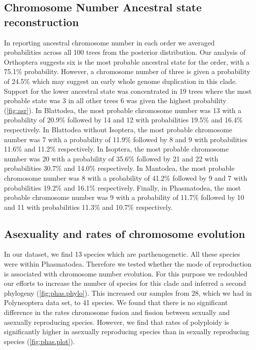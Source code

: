 \subsection{Chromosome Number Ancestral state reconstruction}
In reporting ancestral chromosome number in each order we averaged probabilities across all 100 trees from the posterior distribution. 
Our analysis of Orthoptera suggests six is the most probable ancestral state for the order, with a 75.1\% probability.
However, a chromosome number of three is given a probability of 24.5\% which may suggest an early whole genome duplication in this clade.
Support for the lower ancestral state was concentrated in 19 trees where the most probable state was 3 in all other trees 6 was given the highest probability (\cref{fig:asr}). 
In Blattodea, the most probable chromosome number was 13 with a probability of 20.9\% followed by 14 and 12 with probabilities 19.5\% and 16.4\% respectively. 
In Blattodea without Isoptera, the most probable chromosome number was 7 with a probability of 11.9\% followed by 8 and 9 with probabilities 11.6\% and 11.2\% respectively.
In Isoptera, the most probable chromosome number was 20 with a probability of 35.6\% followed by 21 and 22 with probabilities 30.7\% and 14.0\% respectively.
In Mantodea, the most probable chromosome number was 8 with a probability of 41.2\% followed by 9 and 7 with probabilities 19.2\% and 16.1\% respectively.
Finally, in Phasmatodea, the most probable chromosome number was 9 with a probability of 11.7\% followed by 10 and 11 with probabilities 11.3\% and 10.7\% respectively.

\subsection{Asexuality and rates of chromosome evolution}
In our dataset, we find 13 species which are parthenogenetic.
All these species were within Phasmatodea.
Therefore we tested whether the mode of reproduction is associated with chromosome number evolution. 
For this purpose we redoubled our efforts to increase the number of species for this clade and inferred a second phylogeny (\cref{fig:phas.phylo}).
This increased our samples from 28, which we had in Polyneoptera data set, to 41 species. 
We found that there is no significant difference in the rates chromosome fusion and fission between sexually and asexually reproducing species.
However, we find that rates of polyploidy is significantly higher in asexually reproducing species than in sexually reproducing species (\cref{fig:phas.plot}).
